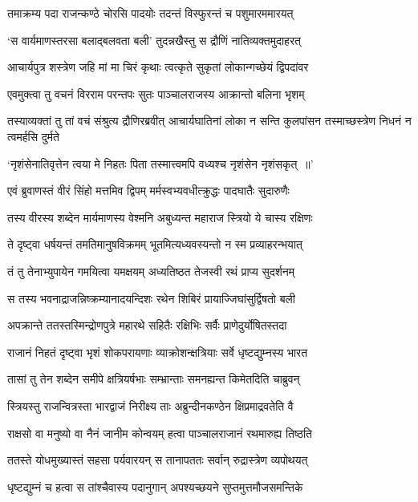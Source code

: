\twolineshloka
{तमाक्रम्य पदा राजन्कण्ठे चोरसि पादयोः}
{तदन्तं विस्फुरन्तं च पशुमारममारयत्}


\twolineshloka
{`स वार्यमाणस्तरसा बलाद्बलवता बली'}
{तुदन्नखैस्तु स द्रौणिं नातिव्यक्तमुदाहरत्}


\twolineshloka
{आचार्यपुत्र शस्त्रेण जहि मां मा चिरं कृथाः}
{त्वत्कृते सुकृतां लोकान्गच्छेयं द्विपदांवर}


\twolineshloka
{एवमुक्त्वा तु वचनं विरराम परन्तपः}
{सुतः पाञ्चालराजस्य आक्रान्तो बलिना भृशम्}


\threelineshloka
{तस्याव्यक्तां तु तां वचं संश्रुत्य द्रौणिरब्रवीत्}
{आचार्यघातिनां लोका न सन्ति कुलपांसन}
{तस्माच्छस्त्रेण निधनं न त्वमर्हसि दुर्मते}


\twolineshloka
{`नृशंसेनातिवृत्तेन त्वया मे निहतः पिता}
{तस्मात्त्वमपि वध्यश्च नृशंसेन नृशंसकृत् ॥'}


\twolineshloka
{एवं ब्रुवाणस्तं वीरं सिंहो मत्तमिव द्विपम्}
{मर्मस्वभ्यवधीत्क्रुद्धः पादघातैः सुदारुणैः}


\twolineshloka
{तस्य वीरस्य शब्देन मार्यमाणस्य वेश्मनि}
{अबुध्यन्त महाराज स्त्रियो ये चास्य रक्षिणः}


\twolineshloka
{ते दृष्ट्वा धर्षयन्तं तमतिमानुषविक्रमम्}
{भूतमित्यध्यवस्यन्तो न स्म प्रव्याहरन्भयात्}


\twolineshloka
{तं तु तेनाभ्युपायेन गमयित्वा यमक्षयम्}
{अध्यतिष्ठत तेजस्वी रथं प्राप्य सुदर्शनम्}


\twolineshloka
{स तस्य भवनाद्राजन्निष्क्रम्यानादयन्दिशः}
{रथेन शिबिरं प्रायाज्जिघांसुर्द्विषतो बली}


\twolineshloka
{अपक्रान्ते ततस्तस्मिन्द्रोणपुत्रे महारथे}
{सहितैः रक्षिभिः सर्वैः प्राणेदुर्योषितस्तदा}


\twolineshloka
{राजानं निहतं दृष्ट्वा भृशं शोकपरायणाः}
{व्याक्रोशन्क्षत्रियाः सर्वे धृष्टद्युम्नस्य भारत}


\twolineshloka
{तासां तु तेन शब्देन समीपे क्षत्रियर्षभाः}
{सम्भ्रान्ताः समनह्यन्त किमेतदिति चाब्रुवन्}


\twolineshloka
{स्त्रियस्तु राजन्वित्रस्ता भारद्वाजं निरीक्ष्य ताः}
{अब्रुन्दीनकण्ठेन क्षिप्रमाद्रवतेति वै}


\twolineshloka
{राक्षसो वा मनुष्यो वा नैनं जानीम कोन्वयम्}
{हत्वा पाञ्चालराजानं रथमारुह्य तिष्ठति}


\twolineshloka
{ततस्ते योधमुख्यास्तं सहसा पर्यवारयन्}
{स तानापततः सर्वान् रुद्रास्त्रेण व्यपोथयत्}


\twolineshloka
{धृष्टद्युम्नं च हत्वा स तांश्चैवास्य पदानुगान्}
{अपश्यच्छयने सुप्तमुत्तमौजसमन्तिके}


